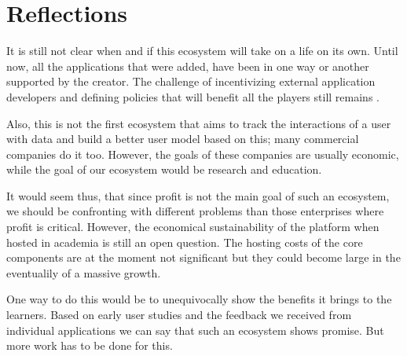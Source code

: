 
\section {Reflections}

It is still not clear when and if this ecosystem will 
take on a life on its own. Until now, all the 
applications that were added, have been in one way
or another supported by the creator. The challenge
of incentivizing external application developers and
defining policies that will benefit all the 
players still remains \cite{Jans09agenda}. 


Also, this is not the first ecosystem that aims to track 
the interactions of a user with data and build a better 
user model based on this; many commercial companies do it too. 
However, the goals of these companies are usually economic, 
while the goal of our ecosystem would be research and education.

It would seem thus, that since profit is not the main
goal of such an ecosystem, we should be confronting
with different problems than those enterprises where 
profit is critical. However, the economical 
sustainability of the platform when hosted in academia
is still an open question. The hosting costs of the 
core components are at the moment not significant 
but they could become large in the eventualily of 
a massive growth.


One way to do this would be to unequivocally show 
the benefits it brings to the learners. Based on 
early user studies and the feedback we received 
from individual applications we can say that such
an ecosystem shows promise. But more work has to 
be done for this. 






